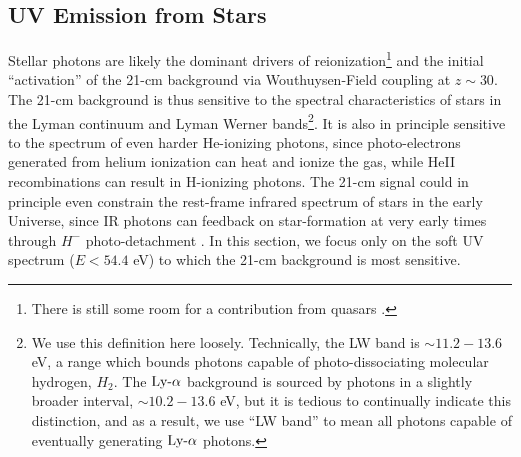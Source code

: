 \subsection{UV Emission from Stars}
Stellar photons are likely the dominant drivers of reionization\footnote{There is still some room for a contribution from quasars \cite[see, e.g.,][]{Madau2018}.} and the initial ``activation'' of the 21-cm background via Wouthuysen-Field coupling at $z \sim 30$. The 21-cm background is thus sensitive to the spectral characteristics of stars in the Lyman continuum and Lyman Werner bands\footnote{We use this definition here loosely. Technically, the LW band is $\sim 11.2-13.6$ eV, a range which bounds photons capable of photo-dissociating molecular hydrogen, $H_2$. The $\text{Ly-}\alpha$ background is sourced by photons in a slightly broader interval, $\sim 10.2-13.6$ eV, but it is tedious to continually indicate this distinction, and as a result, we use ``LW band'' to mean all photons capable of eventually generating $\text{Ly-}\alpha$ photons.}. It is also in principle sensitive to the spectrum of even harder He-ionizing photons, since photo-electrons generated from helium ionization can heat and ionize the gas, while HeII recombinations can result in H-ionizing photons. The 21-cm signal could in principle even constrain the rest-frame infrared spectrum of stars in the early Universe, since IR photons can feedback on star-formation at very early times through $H^-$ photo-detachment \cite{WolcottGreen2012}. In this section, we focus only on the soft UV spectrum ($E < 54.4$ eV) to which the 21-cm background is most sensitive.

